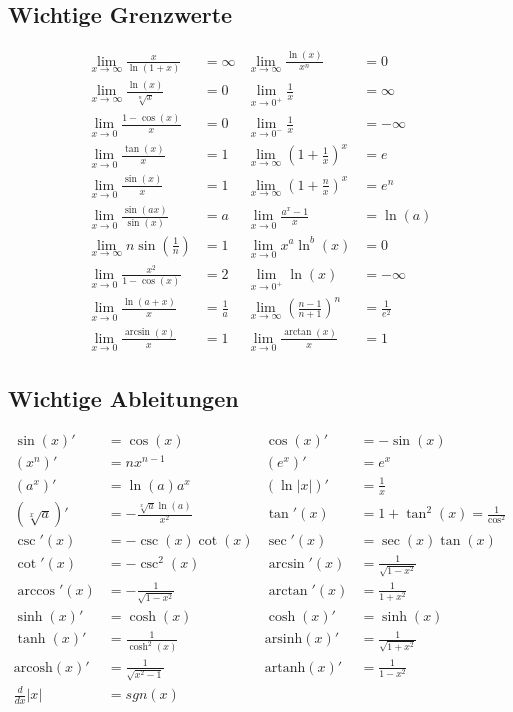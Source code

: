 \documentclass[8pt, a4paper, landscape, fleqn]{scrartcl}
\begin{document}
\begin{multicols*}{3}
			\subsection{Wichtige Grenzwerte}
					\vspace{-7pt}
					\begin{align*}
						\lim_{x \rightarrow \infty}\frac{x}{\ln(1+x)}&=\infty &\lim_{x \rightarrow \infty}\frac{\ln(x)}{x^n}&=0\\
						\lim_{x \rightarrow \infty}\frac{\ln(x)}{\sqrt[n]{x}}&=0 &\lim_{x \rightarrow 0^+}\frac{1}{x}&=\infty\\
						\lim_{x \rightarrow 0}\frac{1-\cos(x)}{x}&=0 &\lim_{x \rightarrow 0^-}\frac{1}{x}&=-\infty\\
						\lim_{x \rightarrow 0}\frac{\tan(x)}{x}&=1 &\lim_{x \rightarrow \infty}(1+\frac{1}{x})^x&=e\\
						\lim_{x \rightarrow 0}\frac{\sin(x)}{x}&=1 &\lim_{x \rightarrow \infty}(1+\frac{n}{x})^x&=e^n\\
						\lim_{x \rightarrow 0}\frac{\sin(ax)}{\sin(x)}&=a &\lim_{x \rightarrow 0}\frac{a^x-1}{x}&=\ln(a)\\
						\lim_{x \rightarrow \infty}n \sin(\frac{1}{n})&=1 &\lim_{x \rightarrow 0}x^a\ln^b(x)&=0\\
						\lim_{x \rightarrow 0}\frac{x^2}{1-\cos(x)}&=2 &\lim_{x \rightarrow 0^+}\ln(x)&=-\infty\\
						\lim_{x \rightarrow 0}\frac{\ln(a+x)}{x}&=\frac{1}{a} &\lim_{x \rightarrow \infty}(\frac{n-1}{n+1})^n&=\frac{1}{e^2}\\
						\lim_{x \rightarrow 0}\frac{\arcsin(x)}{x}&=1 &\lim_{x \rightarrow 0}\frac{\arctan(x)}{x}&=1
					\end{align*}	
			\subsection{Wichtige Ableitungen}
				\vspace{-7pt}
				\begin{align*}
				    \sin(x)'&=\cos(x) &\cos(x)'&=-\sin(x)\\
				    \left(x^n\right)'&=n x^{n-1} &(e^x)'&=e^x\\
					\left(a^x\right)'&=\ln(a)a^x &\left(\ln\vert x \vert \right)'&=\frac{1}{x}\\
					\left(\sqrt[x]{a}\right)'&=-\frac{\sqrt[x]{a}\ln(a)}{x^2}
					&\tan'(x)&=1+\tan^2(x)=\frac{1}{\cos^2}\\
					\csc'(x)&=-\csc(x)\cot(x) &\sec'(x)&=\sec(x)\tan(x)\\
					\cot'(x)&=-\csc^2(x) &\arcsin'(x)&=\frac{1}{\sqrt{1-x^2}}\\
					\arccos'(x)&=-\frac{1}{\sqrt{1-x^2}} &\arctan'(x)&=\frac{1}{1+x^2}\\
					\sinh(x)'&=\cosh(x) &\cosh(x)'&=\sinh(x)\\
					\tanh(x)'&=\frac{1}{\cosh^2(x)} &\text{arsinh}(x)'&=\frac{1}{\sqrt{1+x^2}}\\
					\text{arcosh}(x)'&=\frac{1}{\sqrt{x^2-1}} &\text{artanh}(x)'&=\frac{1}{1-x^2}\\
					\frac{d}{dx} \vert x \vert &= sgn(x)
				\end{align*}

\end{multicols*}
\end{document}
